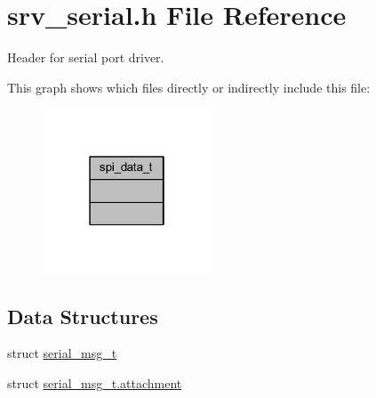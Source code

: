 \hypertarget{a00031}{\section{srv\+\_\+serial.\+h File Reference}
\label{a00031}
}


Header for serial port driver.  


This graph shows which files directly or indirectly include this file\+:\nopagebreak
\begin{figure}[H]
\begin{center}
\leavevmode
\includegraphics[width=142pt]{d0/d54/a01691}
\end{center}
\end{figure}
\subsection*{Data Structures}
\begin{DoxyCompactItemize}
\item 
struct \hyperlink{a00031_d3/d4f/a00761}{serial\+\_\+msg\+\_\+t}
\item 
struct \hyperlink{a00031_df/d5f/a00762}{serial\+\_\+msg\+\_\+t.\+attachment}
\end{DoxyCompactItemize}
